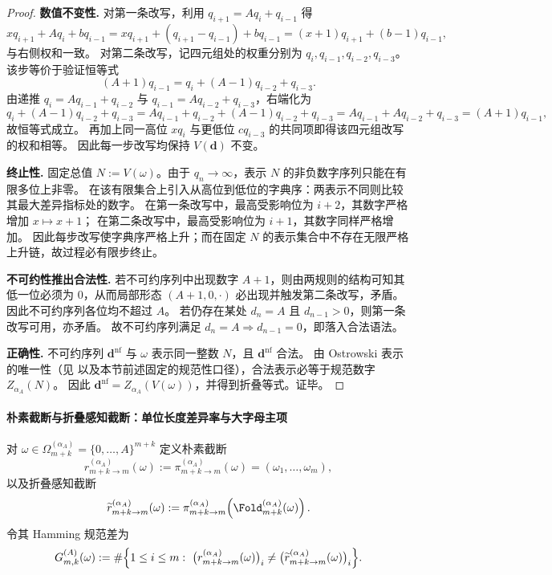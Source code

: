 \begin{proof}
\textbf{数值不变性.}
对第一条改写，利用 \(q_{i+1}=Aq_i+q_{i-1}\) 得
\[
xq_{i+1}+Aq_i+bq_{i-1}
=xq_{i+1}+(q_{i+1}-q_{i-1})+bq_{i-1}
=(x+1)q_{i+1}+(b-1)q_{i-1},
\]
与右侧权和一致。
对第二条改写，记四元组处的权重分别为 \(q_i,q_{i-1},q_{i-2},q_{i-3}\)。
该步等价于验证恒等式
\[
(A+1)q_{i-1}=q_i+(A-1)q_{i-2}+q_{i-3}.
\]
由递推 \(q_i=Aq_{i-1}+q_{i-2}\) 与 \(q_{i-1}=Aq_{i-2}+q_{i-3}\)，右端化为
\[
q_i+(A-1)q_{i-2}+q_{i-3}
=Aq_{i-1}+q_{i-2}+(A-1)q_{i-2}+q_{i-3}
=Aq_{i-1}+Aq_{i-2}+q_{i-3}
=(A+1)q_{i-1},
\]
故恒等式成立。
再加上同一高位 \(xq_i\) 与更低位 \(cq_{i-3}\) 的共同项即得该四元组改写的权和相等。
因此每一步改写均保持 \(V(\mathbf d)\) 不变。
\par
\textbf{终止性.}
固定总值 \(N:=V(\omega)\)。由于 \(q_n\to\infty\)，表示 \(N\) 的非负数字序列只能在有限多位上非零。
在该有限集合上引入从高位到低位的字典序：两表示不同则比较其最大差异指标处的数字。
在第一条改写中，最高受影响位为 \(i+2\)，其数字严格增加 \(x\mapsto x+1\)；
在第二条改写中，最高受影响位为 \(i+1\)，其数字同样严格增加。
因此每步改写使字典序严格上升；而在固定 \(N\) 的表示集合中不存在无限严格上升链，故过程必有限步终止。
\par
\textbf{不可约性推出合法性.}
若不可约序列中出现数字 \(A+1\)，则由两规则的结构可知其低一位必须为 \(0\)，从而局部形态 \((A+1,0,\cdot)\) 必出现并触发第二条改写，矛盾。
因此不可约序列各位均不超过 \(A\)。
若仍存在某处 \(d_{n}=A\) 且 \(d_{n-1}>0\)，则第一条改写可用，亦矛盾。
故不可约序列满足 \(d_n=A\Rightarrow d_{n-1}=0\)，即落入合法语法。
\par
\textbf{正确性.}
不可约序列 \(\mathbf d^{\mathrm{nf}}\) 与 \(\omega\) 表示同一整数 \(N\)，且 \(\mathbf d^{\mathrm{nf}}\) 合法。
由 Ostrowski 表示的唯一性（见 \cite{Ostrowski1922} 以及本节前述固定的规范性口径），合法表示必等于规范数字 \(Z_{\alpha_A}(N)\)。
因此 \(\mathbf d^{\mathrm{nf}}=Z_{\alpha_A}(V(\omega))\)，并得到折叠等式。证毕。
\end{proof}

\paragraph{朴素截断与折叠感知截断：单位长度差异率与大字母主项}
对 \(\omega\in\Omega_{m+k}^{(\alpha_A)}=\{0,\dots,A\}^{m+k}\) 定义朴素截断
\[
r_{m+k\to m}^{(\alpha_A)}(\omega):=\pi_{m+k\to m}^{(\alpha_A)}(\omega)=(\omega_1,\dots,\omega_m),
\]
以及折叠感知截断
\[
\widetilde r_{m+k\to m}^{(\alpha_A)}(\omega)
:=\pi_{m+k\to m}^{(\alpha_A)}\!\left(\Fold_{m+k}^{(\alpha_A)}(\omega)\right).
\]
令其 Hamming 规范差为
\[
G^{(A)}_{m,k}(\omega)
:=\#\Bigl\{1\le i\le m:\ \bigl(r_{m+k\to m}^{(\alpha_A)}(\omega)\bigr)_i\neq \bigl(\widetilde r_{m+k\to m}^{(\alpha_A)}(\omega)\bigr)_i\Bigr\}.
\]

